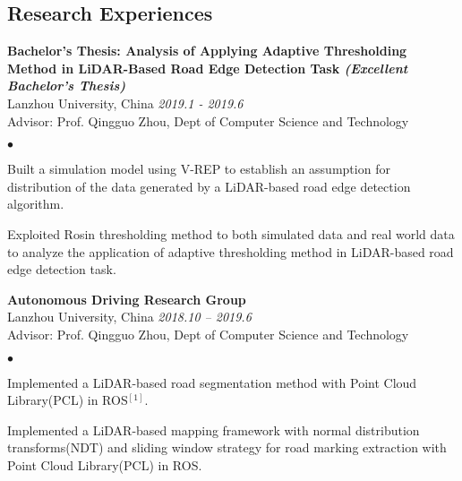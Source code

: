 \documentclass[margin,line,pifont,palatino,courier]{res}
\newenvironment{list1}{
	\begin{list}{\ding{113}}{%
			\setlength{\itemsep}{0in}
			\setlength{\parsep}{0in} \setlength{\parskip}{0in}
			\setlength{\topsep}{0in} \setlength{\partopsep}{0in}
			\setlength{\leftmargin}{0.17in}}}{\end{list}}
\newenvironment{list2}{
	\begin{list}{$\bullet$}{%
			\setlength{\itemsep}{0in}
			\setlength{\parsep}{0in} \setlength{\parskip}{0in}
			\setlength{\topsep}{0in} \setlength{\partopsep}{0in}
			\setlength{\leftmargin}{0.2in}}}{\end{list}}
\begin{document}
\begin{resume}
%		
			
		\section{\sc Research Experiences}
		
		{\bf Bachelor's Thesis: Analysis of Applying Adaptive Thresholding Method in LiDAR-Based Road Edge Detection Task \it (Excellent Bachelor's Thesis)}\\
		Lanzhou University, China \hfill {\sl 2019.1 - 2019.6} \\
		Advisor: Prof. Qingguo Zhou, Dept of Computer Science and Technology
		\begin{list2}
			\item Built a simulation model using V-REP to establish an assumption for distribution of the data generated by a LiDAR-based road edge detection algorithm.
			\item Exploited Rosin thresholding method to both simulated data and real world data to analyze the application of adaptive thresholding method in LiDAR-based road edge detection task.
		\end{list2}
		
		{\bf Autonomous Driving Research Group} \\
		Lanzhou University, China \hfill {\sl 2018.10 -- 2019.6} \\
		Advisor: Prof. Qingguo Zhou, Dept of Computer Science and Technology
		\begin{list2}
			\item Implemented a LiDAR-based road segmentation method with Point Cloud Library(PCL) in ROS$^{[1]}$.
			\item Implemented a LiDAR-based mapping framework with normal distribution transforms(NDT) and sliding window strategy for road marking extraction with Point Cloud Library(PCL) in ROS.
		\end{list2}
	

\end{resume}
\end{document}

